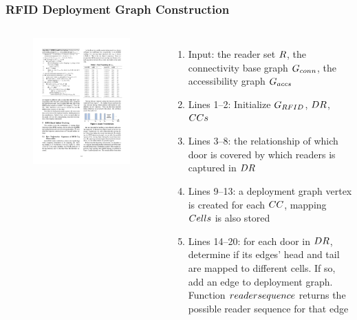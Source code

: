 \begin{frame}
\frametitle{RFID Deployment Graph Construction}

\begin{columns}[c]

    \begin{figure}[tb]
      \includegraphics[width=\columnwidth]{figures/2-1/2-1-5.pdf}
    \end{figure}

  \scriptsize{
    \begin{enumerate}
      \item Input: \textrm{the reader set $\mathnormal{R}$, the connectivity base graph $\mathnormal{G_{conn}}$, the accessibility graph $\mathnormal{G_{accs}}$} \pause
      \item Lines 1--2: \textrm{Initialize $\mathnormal{G_{RFID}}$, $\mathnormal{DR}$, $\mathnormal{CCs}$} \pause
      \item Lines 3--8: \textrm{the relationship of which door is covered by which readers is captured in $\mathnormal{DR}$} \pause
      \item Lines 9--13: \textrm{a deployment graph vertex is created for each $\mathnormal{CC}$, mapping $\mathnormal{Cells}$ is also stored} \pause
      \item Lines 14--20: \textrm{for each door in $\mathnormal{DR}$, determine if its edges' head and tail are mapped to different cells. If so, add an edge to deployment graph. Function $\mathnormal{readersequence}$ returns the possible reader sequence for that edge}
    \end{enumerate}
  }
  \end{columns}


\end{frame}
